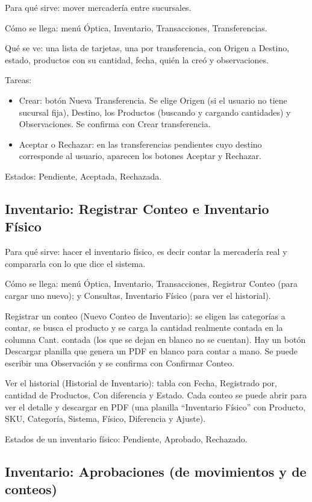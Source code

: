 Para qué sirve: mover mercadería entre sucursales.

Cómo se llega: menú Óptica, Inventario, Transacciones, Transferencias.

Qué se ve: una lista de tarjetas, una por transferencia, con Origen a Destino, estado, productos con su cantidad, fecha, quién la creó y observaciones.

Tareas:
\begin{itemize}
  \item Crear: botón Nueva Transferencia. Se elige Origen (si el usuario no tiene sucursal fija), Destino, los Productos (buscando y cargando cantidades) y Observaciones. Se confirma con Crear transferencia.
  \item Aceptar o Rechazar: en las transferencias pendientes cuyo destino corresponde al usuario, aparecen los botones Aceptar y Rechazar.
\end{itemize}

Estados: Pendiente, Aceptada, Rechazada.

\subsection{Inventario: Registrar Conteo e Inventario Físico}
\label{sec:mu-inventario-conteo}

Para qué sirve: hacer el inventario físico, es decir contar la mercadería real y compararla con lo que dice el sistema.

Cómo se llega: menú Óptica, Inventario, Transacciones, Registrar Conteo (para cargar uno nuevo); y Consultas, Inventario Físico (para ver el historial).

Registrar un conteo (Nuevo Conteo de Inventario): se eligen las categorías a contar, se busca el producto y se carga la cantidad realmente contada en la columna Cant. contada (los que se dejan en blanco no se cuentan). Hay un botón Descargar planilla que genera un PDF en blanco para contar a mano. Se puede escribir una Observación y se confirma con Confirmar Conteo.

Ver el historial (Historial de Inventario): tabla con Fecha, Registrado por, cantidad de Productos, Con diferencia y Estado. Cada conteo se puede abrir para ver el detalle y descargar en PDF (una planilla ``Inventario Físico'' con Producto, SKU, Categoría, Sistema, Físico, Diferencia y Ajuste).

Estados de un inventario físico: Pendiente, Aprobado, Rechazado.

\subsection{Inventario: Aprobaciones (de movimientos y de conteos)}
\label{sec:mu-inventario-aprobaciones}

